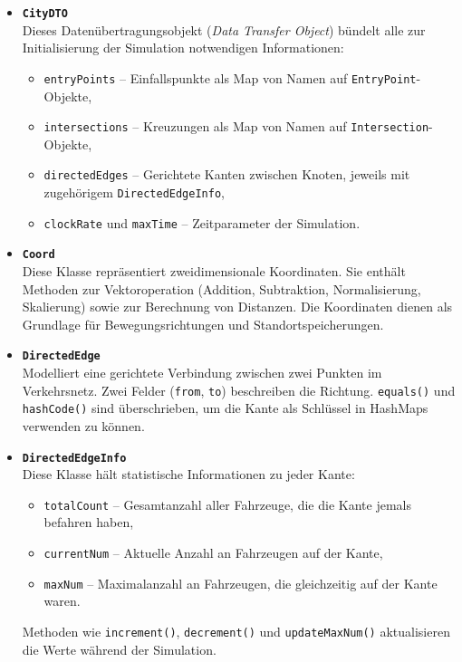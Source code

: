 \begin{itemize}
  \item \textbf{\texttt{CityDTO}}\\
  Dieses Datenübertragungsobjekt (\emph{Data Transfer Object}) bündelt alle zur Initialisierung der Simulation notwendigen Informationen:
  \begin{itemize}
    \item \texttt{entryPoints} -- Einfallspunkte als Map von Namen auf \texttt{EntryPoint}-Objekte,
    \item \texttt{intersections} -- Kreuzungen als Map von Namen auf \texttt{Intersection}-Objekte,
    \item \texttt{directedEdges} -- Gerichtete Kanten zwischen Knoten, jeweils mit zugehörigem \texttt{DirectedEdgeInfo},
    \item \texttt{clockRate} und \texttt{maxTime} -- Zeitparameter der Simulation.
  \end{itemize}

  \item \textbf{\texttt{Coord}}\\
  Diese Klasse repräsentiert zweidimensionale Koordinaten.
  Sie enthält Methoden zur Vektoroperation (Addition, Subtraktion, Normalisierung, Skalierung) sowie zur Berechnung von Distanzen.
  Die Koordinaten dienen als Grundlage für Bewegungsrichtungen und Standortspeicherungen.

  \item \textbf{\texttt{DirectedEdge}}\\
  Modelliert eine gerichtete Verbindung zwischen zwei Punkten im Verkehrsnetz.
  Zwei Felder (\texttt{from}, \texttt{to}) beschreiben die Richtung. \texttt{equals()} und \texttt{hashCode()} sind überschrieben, um die Kante als Schlüssel in HashMaps verwenden zu können.

  \item \textbf{\texttt{DirectedEdgeInfo}}\\
  Diese Klasse hält statistische Informationen zu jeder Kante:
  \begin{itemize}
    \item \texttt{totalCount} -- Gesamtanzahl aller Fahrzeuge, die die Kante jemals befahren haben,
    \item \texttt{currentNum} -- Aktuelle Anzahl an Fahrzeugen auf der Kante,
    \item \texttt{maxNum} -- Maximalanzahl an Fahrzeugen, die gleichzeitig auf der Kante waren.
  \end{itemize}
  Methoden wie \texttt{increment()}, \texttt{decrement()} und \texttt{updateMaxNum()} aktualisieren die Werte während der Simulation.


\end{itemize}
